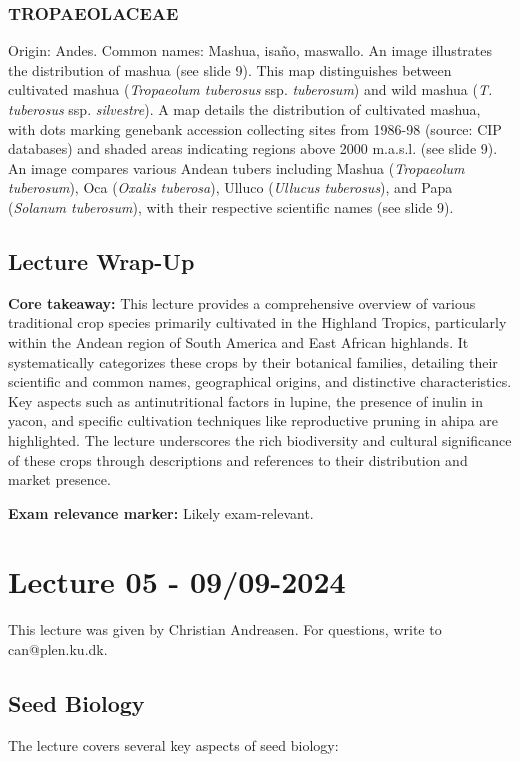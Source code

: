 \subsubsection{TROPAEOLACEAE} 
Origin: Andes. Common names: Mashua, isaño, maswallo. An image illustrates the distribution of mashua (see slide 9). This map distinguishes between cultivated mashua (\textit{Tropaeolum tuberosus} ssp. \textit{tuberosum}) and wild mashua (\textit{T. tuberosus} ssp. \textit{silvestre}). A map details the distribution of cultivated mashua, with dots marking genebank accession collecting sites from 1986-98 (source: CIP databases) and shaded areas indicating regions above 2000 m.a.s.l. (see slide 9). An image compares various Andean tubers including Mashua (\textit{Tropaeolum tuberosum}), Oca (\textit{Oxalis tuberosa}), Ulluco (\textit{Ullucus tuberosus}), and Papa (\textit{Solanum tuberosum}), with their respective scientific names (see slide 9).


\subsection*{Lecture Wrap-Up} \textbf{Core takeaway:} 
This lecture provides a comprehensive overview of various traditional crop species primarily cultivated in the Highland Tropics, particularly within the Andean region of South America and East African highlands. It systematically categorizes these crops by their botanical families, detailing their scientific and common names, geographical origins, and distinctive characteristics. Key aspects such as antinutritional factors in lupine, the presence of inulin in yacon, and specific cultivation techniques like reproductive pruning in ahipa are highlighted. The lecture underscores the rich biodiversity and cultural significance of these crops through descriptions and references to their distribution and market presence. 

\vspace{1em} \textbf{Exam relevance marker:} Likely exam-relevant.

\section{Lecture 05 - 09/09-2024}
This lecture was given by Christian Andreasen. For questions, write to can@plen.ku.dk.
\subsection{Seed Biology} 
The lecture covers several key aspects of seed biology: 

